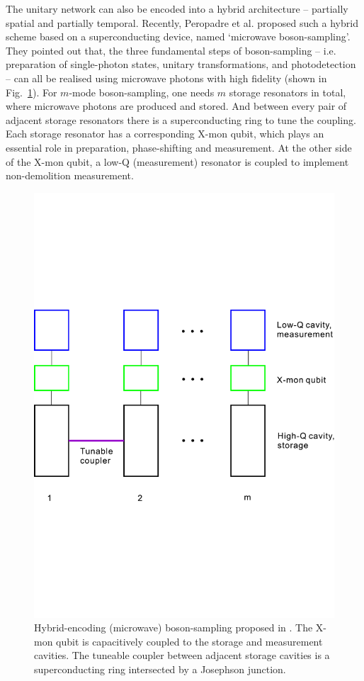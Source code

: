 \documentclass[aps,rmp,twocolumn,amsmath,amssymb,nofootinbib,superscriptaddress]{revtex4}
\begin{document}
The unitary network can also be encoded into a hybrid architecture -- partially spatial and partially temporal. Recently, Peropadre et al. \cite{bib:20} proposed such a hybrid scheme based on a superconducting device, named `microwave boson-sampling'. They pointed out that, the three fundamental steps of boson-sampling -- i.e. preparation of single-photon states, unitary transformations, and photodetection -- can all be realised using microwave photons with high fidelity (shown in Fig.~\ref{fig:microwave}). For $m$-mode boson-sampling, one needs $m$ storage resonators in total, where microwave photons are produced and stored. And between every pair of adjacent storage resonators there is a superconducting ring to tune the coupling. Each storage resonator has a corresponding X-mon qubit, which plays an essential role in preparation, phase-shifting and measurement. At the other side of the X-mon qubit, a low-Q (measurement) resonator is coupled to implement non-demolition measurement.

\begin{figure}[!htb]
\includegraphics[width=\columnwidth]{microwave}
\caption{Hybrid-encoding (microwave) boson-sampling proposed in \cite{bib:20}. The X-mon qubit is capacitively coupled to the storage and measurement cavities. The tuneable coupler between adjacent storage cavities is a superconducting ring intersected by a Josephson junction.} \label{fig:microwave}
\end{figure}
\end{document}
